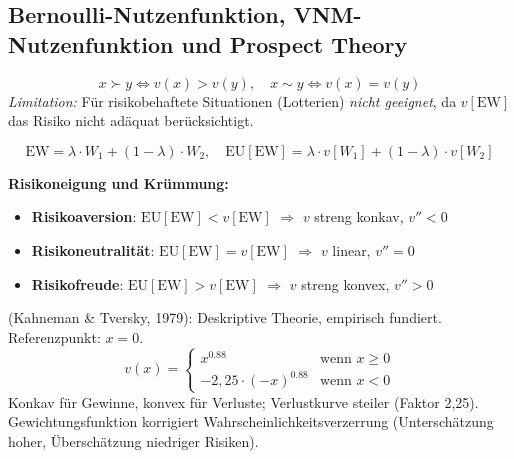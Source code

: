 \newpage

\subsection{Bernoulli-Nutzenfunktion, VNM-Nutzenfunktion und Prospect Theory}

\[
x \succ y \Leftrightarrow v(x) > v(y), \quad x \sim y \Leftrightarrow v(x) = v(y)
\]
\textit{Limitation:} Für risikobehaftete Situationen (Lotterien) \emph{nicht geeignet}, da $v[\mathrm{EW}]$ das Risiko nicht adäquat berücksichtigt.

\[
\mathrm{EW} = \lambda \cdot W_1 + (1-\lambda)\cdot W_2, \quad \mathrm{EU}[\mathrm{EW}] = \lambda \cdot v[W_1] + (1-\lambda)\cdot v[W_2]
\]

\textbf{Risikoneigung und Krümmung:}
\begin{itemize}[leftmargin=1.5em]
    \item \textbf{Risikoaversion}: $\mathrm{EU}[\mathrm{EW}] < v[\mathrm{EW}]$ $\Rightarrow$ $v$ streng konkav, $v'' < 0$
    \item \textbf{Risikoneutralität}: $\mathrm{EU}[\mathrm{EW}] = v[\mathrm{EW}]$ $\Rightarrow$ $v$ linear, $v'' = 0$
    \item \textbf{Risikofreude}: $\mathrm{EU}[\mathrm{EW}] > v[\mathrm{EW}]$ $\Rightarrow$ $v$ streng konvex, $v'' > 0$
\end{itemize}


 (Kahneman \& Tversky, 1979): Deskriptive Theorie, empirisch fundiert. Referenzpunkt: $x = 0$.
\[
v(x) = \begin{cases} x^{0.88} & \text{wenn } x \geq 0 \\ -2{,}25\cdot(-x)^{0.88} & \text{wenn } x < 0 \end{cases}
\]
Konkav für Gewinne, konvex für Verluste; Verlustkurve steiler (Faktor 2,25). Gewichtungsfunktion korrigiert Wahrscheinlichkeitsverzerrung (Unterschätzung hoher, Überschätzung niedriger Risiken).

